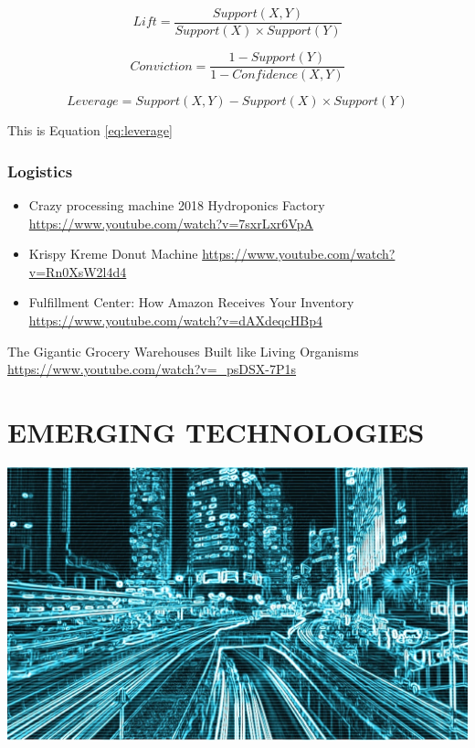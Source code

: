 \documentclass[]{book}
\begin{document}
\[Lift = \frac{Support(X,Y)}{Support(X) \times Support(Y)}\]

\[Conviction = \frac{1 - Support(Y)}{1 - Confidence(X,Y)}\]

\[\begin{equation}
Leverage = Support(X,Y) - Support(X)\times Support(Y)  \label{eq:leverage}
\end{equation}\]

This is Equation \eqref{eq:leverage}

\hypertarget{logistics}{%
\subsection{Logistics}\label{logistics}}

\begin{itemize}
\item
  Crazy processing machine 2018 \textbar{} Hydroponics Factory
  \url{https://www.youtube.com/watch?v=7sxrLxr6VpA}
\item
  Krispy Kreme Donut Machine
  \url{https://www.youtube.com/watch?v=Rn0XsW2l4d4}
\item
  Fulfillment Center:
  How Amazon Receives Your Inventory \url{https://www.youtube.com/watch?v=dAXdeqcHBp4}
\end{itemize}

The Gigantic Grocery Warehouses Built like Living Organisms \url{https://www.youtube.com/watch?v=_psDSX-7P1s}

\hypertarget{emerging-technologies}{%
\chapter{EMERGING TECHNOLOGIES}\label{emerging-technologies}}

\begin{center}\includegraphics[width=0.9\linewidth]{images/computer1280} \end{center}
\end{document}
